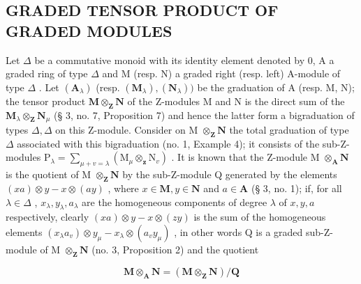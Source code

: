 \subsection{GRADED TENSOR PRODUCT OF GRADED MODULES}

Let \(\Delta\) be a commutative monoid with its identity element denoted by 0, A a graded ring of type \(\Delta\) and M (resp. N) a graded right (resp. left) A-module of type \(\Delta\) . Let \((\mathbf{A}_{\lambda})\) (resp. \((\mathbf{M}_{\lambda}), (\mathbf{N}_{\lambda}))\) be the graduation of A (resp. M, N); the tensor product \(\mathbf{M} \otimes_{\mathbf{Z}} \mathbf{N}\) of the Z-modules M and N is the direct sum of the \(\mathbf{M}_{\lambda} \otimes_{\mathbf{Z}} \mathbf{N}_{\mu}\) (§ 3, no. 7, Proposition 7) and hence the latter form a bigraduation of types \(\Delta, \Delta\) on this Z-module. Consider on M \(\otimes_{\mathbf{Z}} \mathbf{N}\) the total graduation of type \(\Delta\) associated with this bigraduation (no. 1, Example 4); it consists of the sub-Z-modules \(\mathrm{P}_{\lambda} = \sum_{\mu + v = \lambda} (\mathrm{M}_{\mu} \otimes_{\mathbf{z}} \mathrm{N}_{v})\) . It is known that the Z-module M \(\otimes_{\mathbf{A}} \mathbf{N}\) is the quotient of M \(\otimes_{\mathbf{Z}} \mathbf{N}\) by the sub-Z-module Q generated by the elements \((xa) \otimes y - x \otimes (ay)\) , where \(x \in \mathbf{M}, y \in \mathbf{N}\) and \(a \in \mathbf{A}\) (§ 3, no. 1); if, for all \(\lambda \in \Delta\) , \(x_{\lambda}, y_{\lambda}, a_{\lambda}\) are the homogeneous components of degree \(\lambda\) of \(x, y, a\) respectively, clearly \((xa) \otimes y - x \otimes (zy)\) is the sum of the homogeneous elements \((x_{\lambda}a_{v}) \otimes y_{\mu} - x_{\lambda} \otimes (a_{v}y_{\mu})\) , in other words Q is a graded sub-Z-module of M \(\otimes_{\mathbf{Z}} \mathbf{N}\) (no. 3, Proposition 2) and the quotient

\[
\mathbf {M} \otimes_ {\mathbf {A}} \mathbf {N} = (\mathbf {M} \otimes_ {\mathbf {Z}} \mathbf {N}) / \mathbf {Q}
\]

